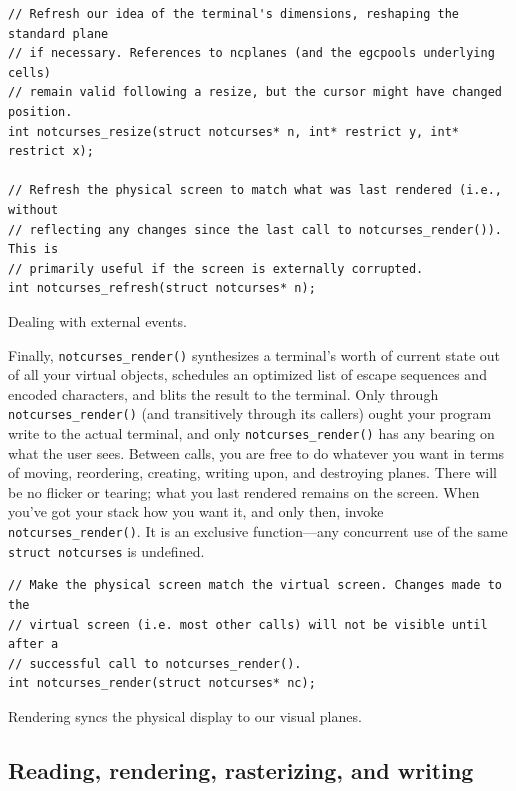 \documentclass[letterpaper,10pt]{article}
\begin{document}
\begin{listing}[!htb]
\begin{verbatim}
// Refresh our idea of the terminal's dimensions, reshaping the standard plane
// if necessary. References to ncplanes (and the egcpools underlying cells)
// remain valid following a resize, but the cursor might have changed position.
int notcurses_resize(struct notcurses* n, int* restrict y, int* restrict x);

// Refresh the physical screen to match what was last rendered (i.e., without
// reflecting any changes since the last call to notcurses_render()). This is
// primarily useful if the screen is externally corrupted.
int notcurses_refresh(struct notcurses* n);
\end{verbatim}
\caption{Dealing with external events.}
\end{listing}

Finally, \texttt{notcurses\_render()} synthesizes a terminal's worth of current
state out of all your virtual objects, schedules an optimized list of escape
sequences and encoded characters, and blits the result to the terminal. Only
through \texttt{notcurses\_render()} (and transitively through its callers) ought
your program write to the actual terminal, and only \texttt{notcurses\_render()}
has any bearing on what the user sees. Between calls, you are free to do whatever
you want in terms of moving, reordering, creating, writing upon, and destroying
planes. There will be no flicker or tearing; what you last rendered remains on
the screen. When you've got your stack how you want it, and only then, invoke
\texttt{notcurses\_render()}. It is an exclusive function---any concurrent use
of the same \texttt{struct notcurses} is undefined.

\begin{listing}[!htb]
\begin{verbatim}
// Make the physical screen match the virtual screen. Changes made to the
// virtual screen (i.e. most other calls) will not be visible until after a
// successful call to notcurses_render().
int notcurses_render(struct notcurses* nc);
\end{verbatim}
\caption{Rendering syncs the physical display to our visual planes.}
\end{listing}

\subsection{Reading, rendering, rasterizing, and writing}
\label{sec:rendering}
\end{document}
